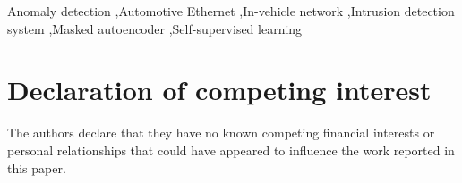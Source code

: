 \documentclass[a4paper,fleqn]{cas-dc}
\begin{document}

\begin{keywords}
Anomaly detection \sep Automotive Ethernet \sep In-vehicle network \sep Intrusion detection system \sep Masked autoencoder \sep Self-supervised learning
\end{keywords}

\maketitle













\printcredits

\section*{Declaration of competing interest}
The authors declare that they have no known competing financial interests or personal
relationships that could have appeared to influence the work reported in this paper.
\end{document}
